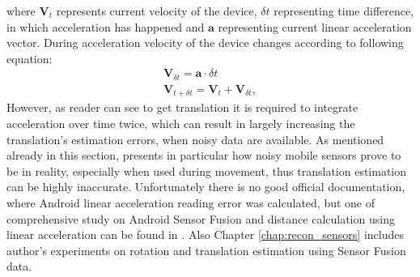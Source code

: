 where $\textbf{V}_{t}$ represents current velocity of the device, $\delta t$ representing time difference, in which acceleration has happened and $\textbf{a}$ representing current linear acceleration vector. During acceleration velocity of the device changes according to following equation: 
\begin{equation}\label{eq:velo_accel}
\begin{array}{c}
\textbf{V}_{\delta t} = \textbf{a} \cdot \delta t \\
\textbf{V}_{t + \delta t} = \textbf{V}_{t} + \textbf{V}_{\delta t},
\end{array}
\end{equation}
However, as reader can see to get translation it is required to integrate acceleration over time twice, which can result in largely increasing the translation's estimation errors, when noisy data are available. 
As mentioned already in this section, \cite{website:androidSensorFusion} presents in particular how noisy mobile sensors prove to be in reality, especially when used during movement, thus translation estimation can be highly inaccurate.
Unfortunately there is no good official documentation, where Android linear acceleration reading error was calculated, but one of comprehensive study on Android Sensor Fusion and distance calculation using linear acceleration can be found in \cite{indoorPosition}. Also Chapter \ref{chap:recon_sensors} includes author's experiments on rotation and translation estimation using Sensor Fusion data.
